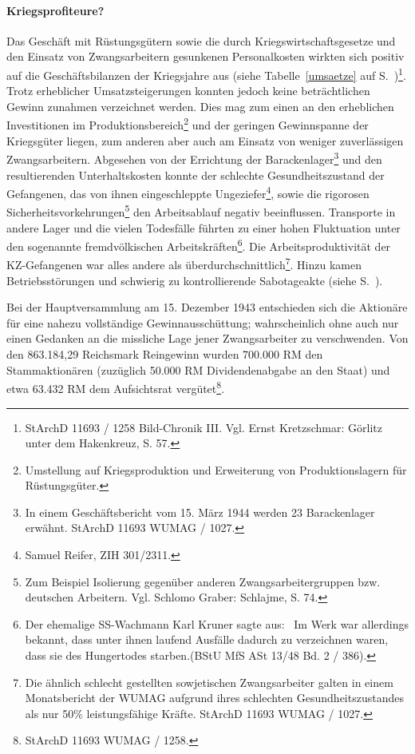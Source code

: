 \paragraph{Kriegsprofiteure?}
Das Geschäft mit Rüstungsgütern sowie die durch Kriegswirtschaftsgesetze und den Einsatz von Zwangsarbeitern gesunkenen Personalkosten wirkten sich positiv auf die Geschäftsbilanzen der Kriegsjahre aus (siehe Tabelle~\ref{umsaetze} auf S.~\pageref{umsaetze})\footnote{StArchD 11693 / 1258 Bild-Chronik III. Vgl. Ernst Kretzschmar: Görlitz unter dem Hakenkreuz, S. 57.}. Trotz erheblicher Umsatzsteigerungen konnten jedoch keine beträchtlichen Gewinn zunahmen verzeichnet werden. Dies mag zum einen an den erheblichen Investitionen im Produktionsbereich\footnote{Umstellung auf Kriegsproduktion und Erweiterung von Produktionslagern für Rüstungsgüter.} und der geringen Gewinnspanne der Kriegsgüter liegen, zum anderen aber auch am Einsatz von weniger zuverlässigen Zwangsarbeitern. Abgesehen von der Errichtung der Barackenlager\footnote{In einem Geschäftsbericht vom 15. März 1944 werden 23 Barackenlager erwähnt. StArchD 11693 WUMAG / 1027.} und den resultierenden Unterhaltskosten konnte der schlechte Gesundheitszustand der Gefangenen, das von ihnen eingeschleppte Ungeziefer\footnote{Samuel Reifer, ZIH 301/2311.}, sowie die rigorosen Sicherheitsvorkehrungen\footnote{Zum Beispiel Isolierung gegenüber anderen Zwangsarbeitergruppen bzw. deutschen Arbeitern. Vgl. Schlomo Graber: Schlajme, S. 74.} den Arbeitsablauf negativ beeinflussen. Transporte in andere Lager und die vielen Todesfälle führten zu einer hohen Fluktuation unter den sogenannte fremdvölkischen Arbeitskräften\footnote{Der ehemalige SS-Wachmann Karl Kruner sagte aus: \glqq~Im Werk war allerdings bekannt, dass unter ihnen laufend Ausfälle dadurch zu verzeichnen waren, dass sie des Hungertodes starben.\grqq (BStU MfS ASt 13/48 Bd. 2 / 386).}. Die Arbeitsproduktivität der KZ-Gefangenen war alles andere als überdurchschnittlich\footnote{Die ähnlich schlecht gestellten sowjetischen Zwangsarbeiter galten in einem Monatsbericht der WUMAG aufgrund ihres schlechten Gesundheitszustandes als nur 50\% leistungsfähige Kräfte. StArchD 11693 WUMAG / 1027.}. Hinzu kamen Betriebsstörungen und schwierig zu kontrollierende Sabotageakte (siehe S.~\pageref{loetzinn}).

Bei der Hauptversammlung am 15. Dezember 1943 entschieden sich die Aktionäre für eine nahezu vollständige Gewinnausschüttung; wahrscheinlich ohne auch nur einen Gedanken an die missliche Lage jener Zwangsarbeiter zu verschwenden. Von den 863.184,29 Reichsmark Reingewinn wurden 700.000 RM den Stammaktionären (zuzüglich 50.000 RM Dividendenabgabe an den Staat) und etwa 63.432 RM dem Aufsichtsrat vergütet\footnote{StArchD 11693 WUMAG / 1258.}.

